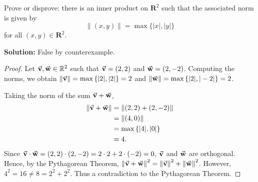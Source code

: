 Prove or disprove: there is an inner product on $\mathbf{R}^2$ such that the associated norm is given by
    \[
        \|(x,y)\| = \max \{ |x|, |y| \}
    \]
    for all $(x,y) \in \mathbf{R}^2$.
\begin{mybox} \textbf{Solution:} False by counterexample.
\begin{proof}
    Let $\vec{\mathbf{v}}, \vec{\mathbf{w}} \in \mathbb{R}^2$ such that $\vec{\mathbf{v}} = \left( {2,2} \right)$ and $\vec{\mathbf{w}} = \left( {2,-2} \right)$. Computing the norms, we obtain $\left\| {\vec{\mathbf{v}}} \right\| = \max\left\{{|2|,|2|}\right\} = 2$ and $\left\| {\vec{\mathbf{w}}} \right\| = \max\left\{{|2|, |-2|}\right\} = 2$.

    \nl Taking the norm of the sum $\vec{\mathbf{v}} + \vec{\mathbf{w}}$,
    \begin{align*}\left\| {\vec{\mathbf{v}} + \vec{\mathbf{w}}} \right\| &= \left\| {(2,2) + (2,-2)} \right\| \\ &= \left\| {(4,0)} \right\| \\ &= \max\left\{{|4|,|0|}\right\} \\ &= 4.
    \end{align*}
    Since $\vec{\mathbf{v}} \cdot \vec{\mathbf{w}} = (2,2) \cdot (2,-2) = 2\cdot 2 + 2 \cdot (-2) = 0$, $\vec{\mathbf{v}}$ and $\vec{\mathbf{w}}$ are orthogonal. Hence, by the Pythagorean Theorem, $\left\| {\vec{\mathbf{v}} + \vec{\mathbf{w}}} \right\|^2 = \left\| {\vec{\mathbf{v}}} \right\|^2 + \left\| {\vec{\mathbf{w}}} \right\|^2$. However,\\
    $4^2 = 16 \neq 8 = 2^2 + 2^2$. Thus a contradiction to the Pythagorean Theorem.
\end{proof}
\end{mybox}